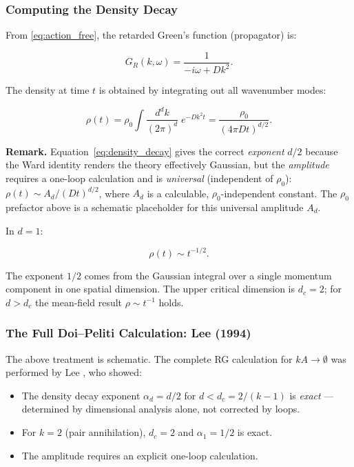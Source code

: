 \documentclass[11pt,a4paper]{article}
\theoremstyle{definition}
\begin{document}
\subsubsection{Computing the Density Decay}

From \eqref{eq:action_free}, the retarded Green's function (propagator) is:

\begin{equation}
  G_R(k, \omega) = \frac{1}{-i\omega + Dk^2}.
  \label{eq:propagator}
\end{equation}

The density at time $t$ is obtained by integrating out all wavenumber modes:

\begin{equation}
  \rho(t) = \rho_0 \int \frac{d^dk}{(2\pi)^d}\; e^{-Dk^2 t}
           = \frac{\rho_0}{(4\pi D t)^{d/2}}.
  \label{eq:density_decay}
\end{equation}

\noindent
\textbf{Remark.} Equation~\eqref{eq:density_decay} gives the correct \emph{exponent}
$d/2$ because the Ward identity renders the theory effectively Gaussian, but the
\emph{amplitude} requires a one-loop calculation and is \emph{universal}
(independent of $\rho_0$): $\rho(t) \sim A_d / (Dt)^{d/2}$, where $A_d$ is a
calculable, $\rho_0$-independent constant. The $\rho_0$ prefactor above is a
schematic placeholder for this universal amplitude $A_d$.

In $d = 1$:

\begin{equation}
  \boxed{\rho(t) \sim t^{-1/2}.}
  \label{eq:rho_half}
\end{equation}

The exponent $1/2$ comes from the Gaussian integral over a single momentum component
in one spatial dimension. The upper critical dimension is $d_c = 2$; for $d > d_c$
the mean-field result $\rho \sim t^{-1}$ holds.

\subsubsection{The Full Doi--Peliti Calculation: Lee (1994)}

The above treatment is schematic. The complete RG calculation for $kA\to\emptyset$
was performed by Lee \cite{lee1994}, who showed:

\begin{itemize}[leftmargin=2em]
  \item The density decay exponent $\alpha_d = d/2$ for $d < d_c = 2/(k-1)$ is
        \emph{exact} --- determined by dimensional analysis alone, not corrected
        by loops.
  \item For $k=2$ (pair annihilation), $d_c = 2$ and $\alpha_1 = 1/2$ is exact.
  \item The amplitude requires an explicit one-loop calculation.
\end{itemize}
\end{document}
